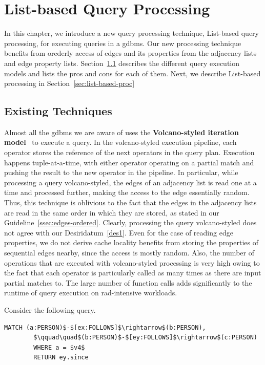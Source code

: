 \chapter{List-based Query Processing}
\label{list-based-processing}

In this chapter, we introduce a new query processing technique, List-based query processing, for executing queries in a \gls{gdbms}. Our new processing technique benefits from orederly access of edges and its properties from the adjacency lists and edge property lists. Section~\ref{sec:existing-techniques} describes the different query execution models and lists the pros and cons for each of them. Next, we describe List-based processing in Section~\ref{sec:list-based-proc}

\section{Existing Techniques}
\label{sec:existing-techniques}
Almost all the \gls{gdbms} we are aware of uses the \textbf{Volcano-styled iteration model}~\cite{volcano} to execute a query. In the volcano-styled execution pipeline, each operator stores the reference of the next operators in the query plan. Execution happens tuple-at-a-time, with either operator operating on a partial match and pushing the result to the new operator in the pipeline. In particular, while processing a query volcano-styled, the edges of an adjacency list is read one at a time and processed further, making the access to the edge essentially random. Thus, this technique is oblivious to the fact that the edges in the adjacency lists are read in the same order in which they are stored, as stated in our Guideline~\ref{ssec:edges-ordered}. Clearly, processing the query volcano-styled does not agree with our Desiridatum~\ref{des1}. Even for the case of reading edge properties, we do not derive cache locality benefits from storing the properties of sequential edges nearby, since the access is mostly random. Also, the number of operations that are executed with volcano-styled processing is very high owing to the fact that each operator is particularly called as many times as there are input partial matches to. The large number of function calls adds significantly to the runtime of query execution on rad-intensive workloads.

\begin{example}
	\label{ex:proc-example}
	Consider the following query. 
	{\em 
		\begin{lstlisting}[numbers=none,  showstringspaces=false,belowskip=0pt ]
		MATCH (a:PERSON)$-$[ex:FOLLOWS]$\rightarrow$(b:PERSON),
		$\qquad\quad$(b:PERSON)$-$[ey:FOLLOWS]$\rightarrow$(c:PERSON)
		WHERE a = $v4$
		RETURN ey.since\end{lstlisting}
	}
\end{example}
\vspace{-5pt}

